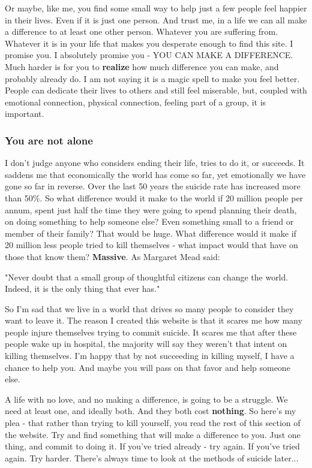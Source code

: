 \documentclass[12pt]{article}
\begin{document}
Or maybe, like me, you find some small way to help just a few people feel happier in their lives. Even if it is just one person. And trust me, in a life we can all make a difference to at least one other person. Whatever you are suffering from. Whatever it is in your life that makes you desperate enough to find this site. I promise you. I absolutely promise you - YOU CAN MAKE A DIFFERENCE. Much harder is for you to \textbf{realize} how much difference you can make, and probably already do. I am not saying it is a magic spell to make you feel better. People can dedicate their lives to others and still feel miserable, but, coupled with emotional connection, physical connection, feeling part of a group, it is important.

\subsubsection{You are not alone}

I don't judge anyone who considers ending their life, tries to do it, or succeeds. It saddens me that economically the world has come so far, yet emotionally we have gone so far in reverse. Over the last 50 years the suicide rate has increased more than 50\%. So what difference would it make to the world if 20 million people per annum, spent just half the time they were going to spend planning their death, on doing something to help someone else? Even something small to a friend or member of their family? That would be huge. What difference would it make if 20 million less people tried to kill themselves - what impact would that have on those that know them? \textbf{Massive}. As Margaret Mead said:

"Never doubt that a small group of thoughtful citizens can change the world. Indeed, it is the only thing that ever has."

So I'm sad that we live in a world that drives so many people to consider they want to leave it. The reason I created this website is that it scares me how many people injure themselves trying to commit suicide. It scares me that after these people wake up in hospital, the majority will say they weren't that intent on killing themselves. I'm happy that by not succeeding in killing myself, I have a chance to help you. And maybe you will pass on that favor and help someone else.

A life with no love, and no making a difference, is going to be a struggle. We need at least one, and ideally both. And they both cost \textbf{nothing}. So here's my plea - that rather than trying to kill yourself, you read the rest of this section of the website. Try and find something that will make a difference to you. Just one thing, and  commit to doing it. If you've tried already - try again. If you've tried again. Try harder. There's always time to look at the methods of suicide later...
\end{document}
